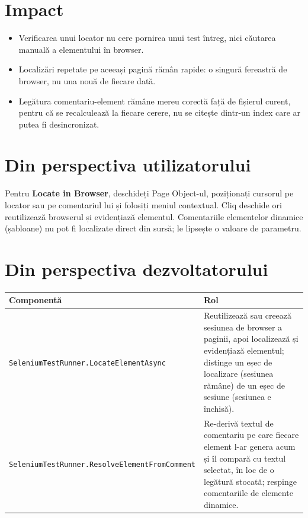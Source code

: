 \documentclass[12pt,a4paper]{report}
\newcommand{\UI}[1]{\textbf{#1}}
\newcommand{\File}[1]{\nolinkurl{#1}}
\begin{document}
\section{Impact}

\begin{itemize}
  \item Verificarea unui locator nu cere pornirea unui test întreg, nici căutarea manuală a elementului în browser.
  \item Localizări repetate pe aceeași pagină rămân rapide: o singură fereastră de browser, nu una nouă de fiecare dată.
  \item Legătura comentariu-element rămâne mereu corectă față de fișierul curent, pentru că se recalculează la fiecare cerere, nu se citește dintr-un index care ar putea fi desincronizat.
\end{itemize}

\section{Din perspectiva utilizatorului}

Pentru \UI{Locate in Browser}, deschideți Page Object-ul, poziționați cursorul pe locator sau pe comentariul lui și folosiți meniul contextual. Cliq deschide ori reutilizează browserul și evidențiază elementul. Comentariile elementelor dinamice (șabloane) nu pot fi localizate direct din sursă; le lipsește o valoare de parametru.

\section{Din perspectiva dezvoltatorului}

\begin{tabularx}{\textwidth}{@{}p{5.3cm}Y@{}}
\toprule \textbf{Componentă} & \textbf{Rol} \\
\midrule
\File{SeleniumTestRunner.LocateElementAsync} & Reutilizează sau creează sesiunea de browser a paginii, apoi localizează și evidențiază elementul; distinge un eșec de localizare (sesiunea rămâne) de un eșec de sesiune (sesiunea e închisă). \\
\File{SeleniumTestRunner.ResolveElementFromComment} & Re-derivă textul de comentariu pe care fiecare element l-ar genera acum și îl compară cu textul selectat, în loc de o legătură stocată; respinge comentariile de elemente dinamice. \\
\bottomrule
\end{tabularx}
\end{document}
